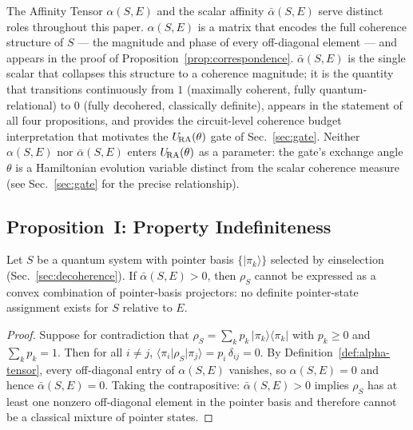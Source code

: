\begin{remark}
\label{rem:tensor-vs-scalar}
The Affinity Tensor $\alpha(S,E)$ and the scalar affinity
$\bar{\alpha}(S,E)$ serve distinct roles throughout this paper.
$\alpha(S,E)$ is a matrix that encodes the full coherence
structure of $S$ --- the magnitude and phase of every off-diagonal
element --- and appears in the proof of
Proposition~\ref{prop:correspondence}.
$\bar{\alpha}(S,E)$ is the single scalar that collapses this structure
to a coherence magnitude; it is the quantity that transitions
continuously from $1$ (maximally coherent, fully quantum-relational)
to $0$ (fully decohered, classically definite), appears in the
statement of all four propositions, and provides the
circuit-level coherence budget interpretation that motivates the
$U_{\!\mathrm{RA}}(\theta)$ gate of Sec.~\ref{sec:gate}.
Neither $\alpha(S,E)$ nor $\bar{\alpha}(S,E)$ enters $U_{\!\mathrm{RA}}(\theta)$ as
a parameter: the gate's exchange angle $\theta$ is a Hamiltonian
evolution variable distinct from the scalar coherence measure
(see Sec.~\ref{sec:gate} for the precise relationship).
\end{remark}


\subsection{\label{sec:prop1}Proposition~I: Property Indefiniteness}

\begin{proposition}
\label{prop:indefiniteness}
Let $S$ be a quantum system with pointer basis
$\{\vert\pi_k\rangle\}$ selected by einselection
(Sec.~\ref{sec:decoherence}).
If $\bar{\alpha}(S,E) > 0$, then $\rho_S$ cannot be expressed as
a convex combination of pointer-basis projectors: no definite
pointer-state assignment exists for $S$ relative to $E$.
\end{proposition}

\begin{proof}
Suppose for contradiction that
$\rho_S = \sum_k p_k\,\vert\pi_k\rangle\langle\pi_k\vert$
with $p_k \geq 0$ and $\sum_k p_k = 1$.
Then for all $i \neq j$,
$\langle\pi_i\vert\rho_S\vert\pi_j\rangle = p_i\,\delta_{ij} = 0$.
By Definition~\ref{def:alpha-tensor}, every off-diagonal entry of
$\alpha(S,E)$ vanishes, so $\alpha(S,E) = 0$ and hence
$\bar{\alpha}(S,E) = 0$.
Taking the contrapositive: $\bar{\alpha}(S,E) > 0$ implies $\rho_S$
has at least one nonzero off-diagonal element in the pointer basis
and therefore cannot be a classical mixture of pointer states.
\end{proof}

